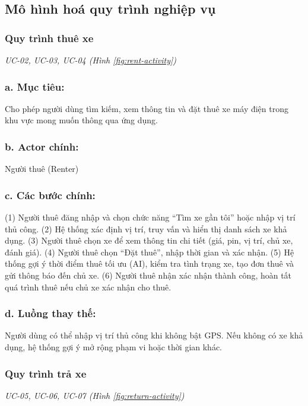 \subsection{Mô hình hoá quy trình nghiệp vụ}

\subsubsection{Quy trình thuê xe}
\label{subsec:rent-activity}
\small\textit{UC-02, UC-03, UC-04 (Hình \ref{fig:rent-activity})}
\subsubsection*{a. Mục tiêu:}
Cho phép người dùng tìm kiếm, xem thông tin và đặt thuê xe máy điện trong khu vực mong muốn thông qua ứng dụng.
\subsubsection*{b. Actor chính:} Người thuê (Renter)
\subsubsection*{c. Các bước chính:}
(1) Người thuê đăng nhập và chọn chức năng “Tìm xe gần tôi” hoặc nhập vị trí thủ công.\newline
(2) Hệ thống xác định vị trí, truy vấn và hiển thị danh sách xe khả dụng.\newline
(3) Người thuê chọn xe để xem thông tin chi tiết (giá, pin, vị trí, chủ xe, đánh giá).\newline
(4) Người thuê chọn “Đặt thuê”, nhập thời gian và xác nhận.\newline
(5) Hệ thống gợi ý thời điểm thuê tối ưu (AI), kiểm tra tình trạng xe, tạo đơn thuê và gửi thông báo đến chủ xe.\newline
(6) Người thuê nhận xác nhận thành công, hoàn tất quá trình thuê nếu chủ xe xác nhận cho thuê.
\subsubsection*{d. Luồng thay thế:}
Người dùng có thể nhập vị trí thủ công khi không bật GPS. Nếu không có xe khả dụng, hệ thống gợi ý mở rộng phạm vi hoặc thời gian khác.

\subsubsection{Quy trình trả xe}
\label{subsec:return-activity}
\small\textit{UC-05, UC-06, UC-07 (Hình \ref{fig:return-activity})}
